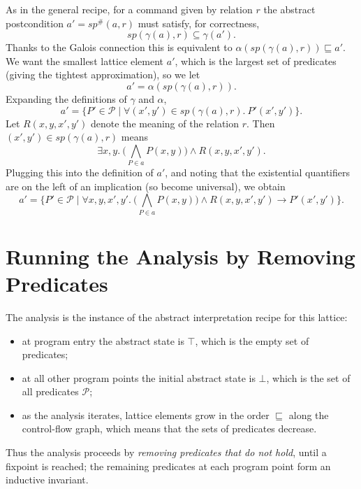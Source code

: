 As in the general recipe, for a command given by relation $r$ the abstract postcondition $a' = sp^\#(a, r)$ must satisfy, for correctness,
\[
sp(\gamma(a), r) \subseteq \gamma(a').
\]
Thanks to the Galois connection this is equivalent to $\alpha(sp(\gamma(a), r)) \sqsubseteq a'$. We want the smallest lattice element $a'$, which is the largest set of predicates (giving the tightest approximation), so we let
\[
a' = \alpha(sp(\gamma(a), r)).
\]
Expanding the definitions of $\gamma$ and $\alpha$,
\[
a' = \{P' \in \mathcal{P} \mid \forall (x', y') \in sp(\gamma(a), r).\ P'(x', y')\}.
\]
Let $R(x, y, x', y')$ denote the meaning of the relation $r$. Then $(x', y') \in sp(\gamma(a), r)$ means
\[
\exists x, y.\ \Big(\bigwedge_{P \in a} P(x, y)\Big) \wedge R(x, y, x', y').
\]
Plugging this into the definition of $a'$, and noting that the existential quantifiers are on the left of an implication (so become universal), we obtain
\[
a' = \Big\{P' \in \mathcal{P} \;\Big|\; \forall x, y, x', y'.\ \Big(\bigwedge_{P \in a} P(x, y)\Big) \wedge R(x, y, x', y') \rightarrow P'(x', y')\Big\}.
\]
 
 
\section{Running the Analysis by Removing Predicates}
 
The analysis is the instance of the abstract interpretation recipe for this lattice:
\begin{itemize}
  \item at program entry the abstract state is $\top$, which is the empty set of predicates;
  \item at all other program points the initial abstract state is $\bot$, which is the set of all predicates $\mathcal{P}$;
  \item as the analysis iterates, lattice elements grow in the order $\sqsubseteq$ along the control-flow graph, which means that the sets of predicates decrease.
\end{itemize}
Thus the analysis proceeds by \emph{removing predicates that do not hold}, until a fixpoint is reached; the remaining predicates at each program point form an inductive invariant.

% 
